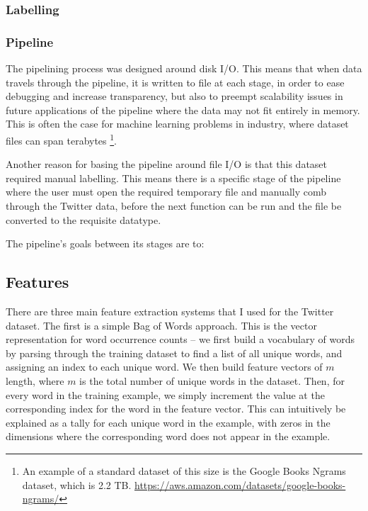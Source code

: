 \documentclass[12pt,a4paper,twoside,openright]{report}
\begin{document}
\subsubsection{Labelling}
\label{sec:impLabel}

\subsubsection{Pipeline}
\label{sec:impPipeline}


The pipelining process was designed around disk I/O. This means that when data travels through the pipeline,
it is written to file at each stage, in order to ease debugging and increase transparency, but also to
preempt scalability issues in future applications of the pipeline where the data may not fit entirely in memory.
This is often the case for machine learning problems in industry, where dataset files can span terabytes
\footnote{An example of a standard dataset of this size is the Google Books Ngrams dataset, which is 2.2 TB. 
\url{https://aws.amazon.com/datasets/google-books-ngrams/}}.

Another reason for basing the pipeline around file I/O is that this dataset required manual labelling.
This means there is a specific stage of the pipeline where the user must open the required temporary
file and manually comb through the Twitter data, before the next function can be run and the file
be converted to the requisite datatype.

The pipeline's goals between its stages are to:

\subsection{Features}
\label{sec:impSentiFeat}
There are three main feature extraction systems that I used for the Twitter dataset. The first is
a simple Bag of Words approach. This is the vector representation for word occurrence counts --
we first build a vocabulary of words by parsing through the training dataset to find a list of all unique words,
and assigning an index to each unique word. We then build feature vectors of $m$ length, where $m$ is the
total number of unique words in the dataset. Then, for every word in the training example, we simply
increment the value at the corresponding index for the word in the feature vector. This can intuitively
be explained as a tally for each unique word in the example, with zeros in the dimensions where the
corresponding word does not appear in the example. 
\end{document}
